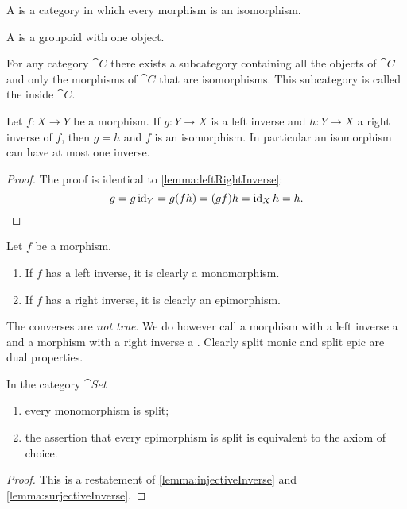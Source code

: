 \begin{definition}
A  is a category in which every morphism is an isomorphism.

A  is a groupoid with one object.
\end{definition}

\begin{lemma}
For any category $\cat{C}$ there exists a subcategory containing all the objects of $\cat{C}$ and only the morphisms of $\cat{C}$ that are isomorphisms. This subcategory is called the  inside $\cat{C}$.
\end{lemma}

\begin{lemma}
Let $f:X\to Y$ be a morphism. If $g: Y\to X$ is a left inverse and $h: Y\to X$ a right inverse of $f$, then $g=h$ and $f$ is an isomorphism. In particular an isomorphism can have at most one inverse.
\end{lemma}
\begin{proof}
The proof is identical to \ref{lemma:leftRightInverse}:
\[ g = g\operatorname{id}_Y = g(fh) = (gf)h = \operatorname{id}_Xh = h. \]
\end{proof}

\begin{lemma}
Let $f$ be a morphism.
\begin{enumerate}
\item If $f$ has a left inverse, it is clearly a monomorphism.
\item If $f$ has a right inverse, it is clearly an epimorphism.
\end{enumerate}
\end{lemma} 
The converses are \emph{not true}. We do however call a morphism with a left inverse a  and a morphism with a right inverse a . Clearly split monic and split epic are dual properties.

\begin{lemma}
In the category $\cat{Set}$
\begin{enumerate}
\item every monomorphism is split;
\item the assertion that every epimorphism is split is equivalent to the axiom of choice.
\end{enumerate}
\end{lemma}
\begin{proof}
This is a restatement of \ref{lemma:injectiveInverse} and \ref{lemma:surjectiveInverse}.
\end{proof}

